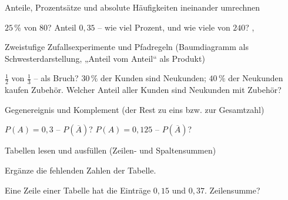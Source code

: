 \setcounter{aufgabe}{0}

\begin{aufgabe}{Anteile, Prozentsätze und absolute Häufigkeiten ineinander umrechnen}
\begin{teile}
\teil $25\,\%$ von $80$? \leerfeld
\teil Anteil $0{,}35$ – wie viel Prozent, und wie viele von $240$? \leerfeld[\%] , \leerfeld
\end{teile}
\end{aufgabe}

\begin{aufgabe}{Zweistufige Zufallsexperimente und Pfadregeln (Baumdiagramm als Schwesterdarstellung, „Anteil vom Anteil“ als Produkt)}
\begin{teile}
\teil $\frac{1}{2}$ von $\frac{1}{3}$ – als Bruch? \leerfeld
\teil $30\,\%$ der Kunden sind Neukunden; $40\,\%$ der Neukunden kaufen Zubehör. Welcher Anteil aller Kunden sind Neukunden mit Zubehör? \leerfeld[\%]
\end{teile}
\end{aufgabe}

\begin{aufgabe}{Gegenereignis und Komplement (der Rest zu eins bzw. zur Gesamtzahl)}
\begin{teile}
\teil $P(A) = 0{,}3$ – $P(\overline{A})$? \leerfeld
\teil $P(A) = 0{,}125$ – $P(\overline{A})$? \leerfeld
\end{teile}
\end{aufgabe}

\begin{aufgabe}{Tabellen lesen und ausfüllen (Zeilen- und Spaltensummen)}
\begin{teile}
\teil Ergänze die fehlenden Zahlen der Tabelle.

\teil Eine Zeile einer Tabelle hat die Einträge $0{,}15$ und $0{,}37$. Zeilensumme? \leerfeld
\end{teile}
\end{aufgabe}

